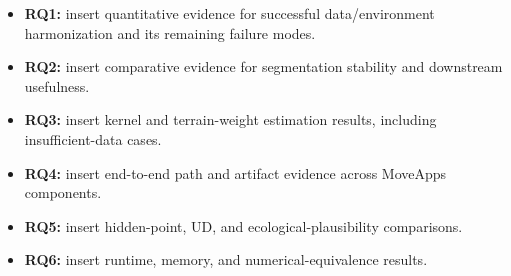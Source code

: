 \begin{itemize}
  \item \textbf{RQ1:} insert quantitative evidence for successful data/environment harmonization and its remaining failure modes.
  \item \textbf{RQ2:} insert comparative evidence for segmentation stability and downstream usefulness.
  \item \textbf{RQ3:} insert kernel and terrain-weight estimation results, including insufficient-data cases.
  \item \textbf{RQ4:} insert end-to-end path and artifact evidence across MoveApps components.
  \item \textbf{RQ5:} insert hidden-point, UD, and ecological-plausibility comparisons.
  \item \textbf{RQ6:} insert runtime, memory, and numerical-equivalence results.
\end{itemize}
